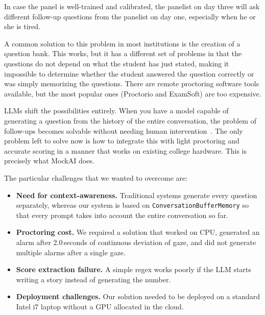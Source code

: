 \documentclass[conference]{IEEEtran}
\begin{document}
In case the panel is well-trained and calibrated, the panelist on day
three will ask different follow-up questions from the panelist on day
one, especially when he or she is tired.

A common solution to this problem in most institutions is the creation
of a question bank. This works, but it has a different set of problems
in that the questions do not depend on what the student has just stated,
making it impossible to determine whether the student answered the
question correctly or was simply memorizing the questions. There are
remote proctoring software tools available, but the most popular ones
(Proctorio and ExamSoft) are too expensive.

LLMs shift the possibilities entirely. When you have a model capable of
generating a question from the history of the entire conversation, the
problem of follow-ups becomes solvable without needing human
intervention~\cite{brown2020}. The only problem left to solve now is
how to integrate this with light proctoring and accurate scoring in a
manner that works on existing college hardware. This is precisely what
MockAI does.

The particular challenges that we wanted to overcome are:

\begin{itemize}
  \item \textbf{Need for context-awareness.} Traditional systems generate
    every question separately, whereas our system is based on
    \texttt{ConversationBufferMemory} so that every prompt takes into
    account the entire conversation so far.

  \item \textbf{Proctoring cost.} We required a solution that worked on
    CPU, generated an alarm after 2.0\,seconds of continuous deviation
    of gaze, and did not generate multiple alarms after a single gaze.

  \item \textbf{Score extraction failure.} A simple regex works poorly
    if the LLM starts writing a story instead of generating the number.

  \item \textbf{Deployment challenges.} Our solution needed to be
    deployed on a standard Intel i7 laptop without a GPU allocated in
    the cloud.
\end{itemize}
\end{document}
